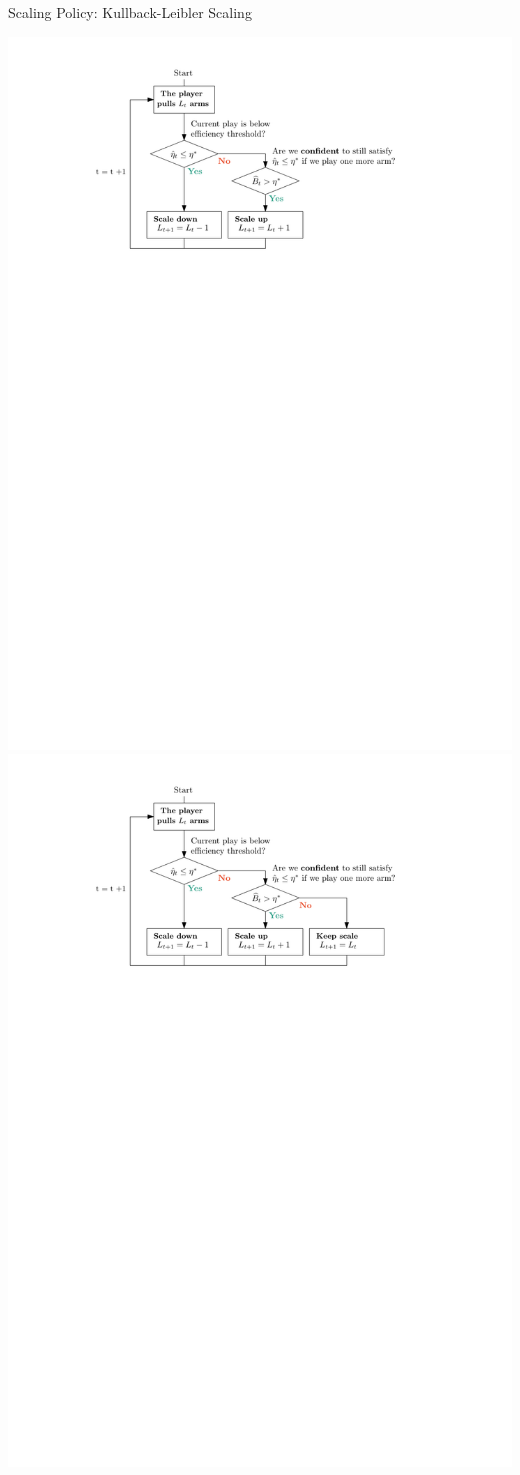 \documentclass[16pt,usenames,dvipsnames, notheorems]{beamer}
\theoremstyle{definition}
\theoremstyle{example}
\theoremstyle{plain}
\begin{document}
\begin{frame}{Scaling Policy: Kullback-Leibler Scaling}
\begin{overprint}
	 \centering \includegraphics[width=0.9\linewidth]{figures/picture_scaling_2-compressed.pdf}
	\onslide<5> \centering \includegraphics[width=0.9\linewidth]{figures/picture_scaling_1-compressed.pdf}

\end{overprint}
\end{frame}
\end{document}
